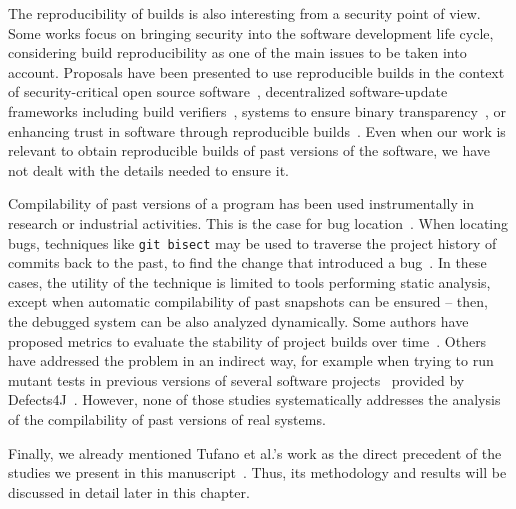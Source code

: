 The reproducibility of builds is also interesting from a security point of view.
Some works focus on bringing security into the software development life cycle, considering build reproducibility as one of the main issues to be taken into account. Proposals have been presented to use reproducible builds in the context of security-critical open source software~\cite{deCarnedeCarnavalet:2014:CIV:2664243.2664288}, decentralized software-update frameworks including build verifiers~\cite{nikitin2017chainiac}, systems to ensure binary transparency~\cite{hassan2017automatic}, or enhancing trust in software through reproducible builds~\cite{Skrimstad:Thesis:2018}.
Even when our work is relevant to obtain reproducible builds of past versions of the software, we have not dealt with the details needed to ensure it.

Compilability of past versions of a program has been used instrumentally in research or industrial activities.
This is the case for bug location~\cite{Sliwerski:2005:CIF:1083142.1083147,Asaduzzaman:2012:BIC:2664446.2664463,Murgia:2010:MLA:1852786.1852794,Zimmermann:2006:MVA:1137983.1138001,Zimmermann2008}.
When locating bugs, techniques like \texttt{git bisect} may be used to traverse the project history of commits back to the past, to find the change that introduced a bug~\cite{spinellis2012git,meneely2013patch}. In these cases, the utility of the technique is limited to tools performing static analysis, except when automatic compilability of past snapshots can be ensured -- then, the debugged system can be also analyzed dynamically.
Some authors have proposed metrics to evaluate the stability of project builds over time~\cite{6405296}.
Others have addressed the problem in an indirect way, for example when trying to run mutant tests in previous versions of several software projects~\cite{Just:2014:MVS:2635868.2635929} provided by Defects4J~\cite{Just:2014:DDE:2610384.2628055}. However, none of those studies systematically addresses the analysis of the compilability of past versions of real systems.

Finally, we already mentioned Tufano et al.'s work as the direct precedent of the studies we present in this manuscript~\cite{tufano2017there}. Thus, its methodology and results will be discussed in detail later in this chapter.
